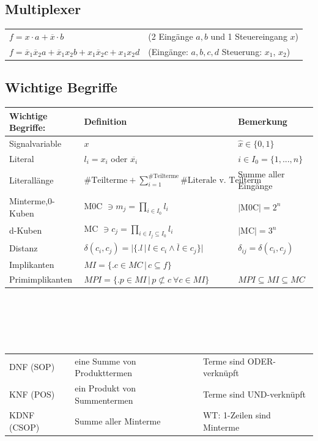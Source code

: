\documentclass[6pt,a4paper]{scrartcl}
\newcommand{\iset}[2]{\ensuremath{\bigl\{ \bigl. #1 \, \bigr| \, #2 \bigr\}}}		%
\newcommand{\eset}[1]{\ensuremath{\bigl\{#1\bigr\}}}								%
\newcommand{\ol}[1]{\ensuremath{\overline{#1}}}									%
\begin{document}
\begin{multicols*}{3}
	\subsection{Multiplexer}
	\begin{tabular}{ll}
		$f = x \cdot a + \overline x \cdot b$ & (2 Eingänge $a,b$ und 1 Steuereingang $x$)\\
		$f = \ol x_1 \ol x_2 a + \ol x_1 x_2 b + x_1  \ol x_2 c + x_1 x_2d$ & (Eingänge: $a,b,c,d$  Steuerung: $x_1$, $x_2$)\\
	\end{tabular}



	\subsection{Wichtige Begriffe}
	\begin{tabular}{l|l|l}
		Wichtige Begriffe: & Definition & Bemerkung\\ \hline
		Signalvariable & $x$ & $\hat x \in \eset{0,1}$ \\
		Literal & $l_i = x_i$ oder $\overline{x_i}$ & $i \in I_0=\eset{1,...,n}$\\
		Literallänge &$\#\text{Teilterme}+\sum_{i=1}^{\#\text{Teilterme}}\#\text{Literale v. Teilterm}$ & Summe aller Eingänge\\
		Minterme,0-Kuben & M0C $\ni m_j = \prod\limits_{i\in I_0} l_i$ & $|$M0C$| = 2^n$ \\
		d-Kuben & MC $\ni c_j = \prod\limits_{i\in I_j \subseteq I_0} l_i$ & $|$MC$|=3^n$\\
		Distanz & $\delta(c_i,c_j) = \bigl| \iset{l}{l \in c_i \land \overline{l}\in c_j}  \bigr|$ & $\delta_{ij} = \delta(c_i,c_j)$ \\
		Implikanten & $MI = \iset{c \in MC}{c \subseteq f}$ &  \\
		Primimplikanten & $MPI = \iset{p \in MI}{p \not\subset c \ \forall c \in MI}$ & $MPI \subseteq MI \subseteq MC$\\
	\end{tabular}\\ \\ \\ \\
	\begin{tabular}{l|l|l}	
		DNF (SOP) & eine Summe von Produkttermen & Terme sind ODER-verknüpft \\
		KNF (POS) & ein Produkt von Summentermen & Terme sind UND-verknüpft\\
		KDNF (CSOP)& Summe aller Minterme & WT: 1-Zeilen sind Minterme\\

\end{tabular}
\end{multicols*}
\end{document}
